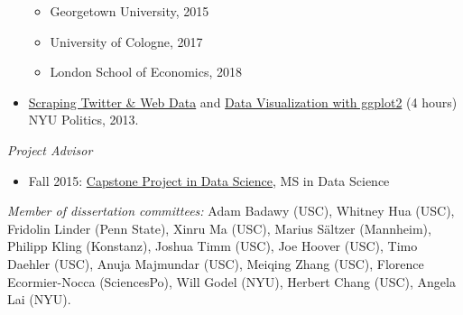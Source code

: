 \documentclass[margin,line,11pt]{resume}
\begin{document}
\begin{resume}
\begin{itemize}
\begin{itemize}
\item Georgetown University, 2015
\vspace{-.1cm}
\item University of Cologne, 2017
\vspace{-.1cm}
\item London School of Economics, 2018
\end{itemize}
\item \href{https://github.com/pablobarbera/workshop}{Scraping Twitter \& Web Data} and \href{https://github.com/pablobarbera/Rdataviz}{Data Visualization with ggplot2} (4 hours) NYU Politics, 2013.
\end{itemize}

\emph{Project Advisor}
\begin{itemize}
\item Fall 2015: \href{http://cds.nyu.edu/academics/ms-in-data-science/curriculum/required-courses/#ds-ga-1006}{Capstone Project in Data Science}, MS in Data Science
\end{itemize}

\emph{Member of dissertation committees:} Adam Badawy (USC), Whitney Hua (USC), Fridolin Linder (Penn State), Xinru Ma (USC), Marius S\"{a}ltzer (Mannheim), Philipp Kling (Konstanz), Joshua Timm (USC), Joe Hoover (USC), Timo Daehler (USC), Anuja Majmundar (USC), Meiqing Zhang (USC), Florence Ecormier-Nocca (SciencesPo), Will Godel (NYU), Herbert Chang (USC), Angela Lai (NYU).





\end{resume}
\end{document}
